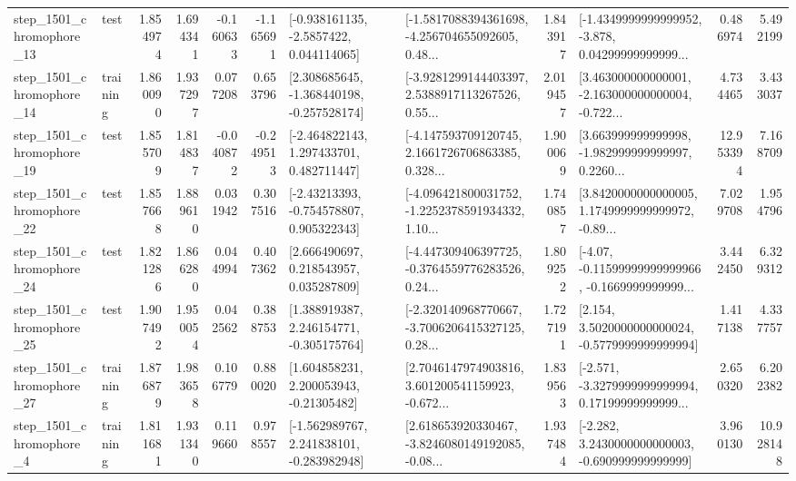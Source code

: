 \begin{tabular}{llrrrrllrlrr}
 step\_1501\_chromophore\_13 &      test &      1.854974 &    1.694341 &     -0.160633 & -1.165691 &     [-0.938161135, -2.5857422, 0.044114065] &  [-1.5817088394361698, -4.256704655092605, 0.48... &       1.843917 &  [-1.4349999999999952, -3.878, 0.04299999999999... &            0.486974 &          5.492199 \\
 step\_1501\_chromophore\_14 &  training &      1.860090 &    1.937297 &      0.077208 &  0.653796 &   [2.308685645, -1.368440198, -0.257528174] &  [-3.9281299144403397, 2.5388917113267526, 0.55... &       2.019457 &  [3.463000000000001, -2.163000000000004, -0.722... &            4.734465 &          3.433037 \\
 step\_1501\_chromophore\_19 &      test &      1.855709 &    1.814837 &     -0.040872 & -0.249513 &    [-2.464822143, 1.297433701, 0.482711447] &  [-4.147593709120745, 2.1661726706863385, 0.328... &       1.900069 &  [3.663999999999998, -1.982999999999997, 0.2260... &           12.953394 &          7.168709 \\
 step\_1501\_chromophore\_22 &      test &      1.857668 &    1.889610 &      0.031942 &  0.307516 &    [-2.43213393, -0.754578807, 0.905322343] &  [-4.096421800031752, -1.2252378591934332, 1.10... &       1.740857 &  [3.8420000000000005, 1.1749999999999972, -0.89... &            7.029708 &          1.954796 \\
 step\_1501\_chromophore\_24 &      test &      1.821286 &    1.866280 &      0.044994 &  0.407362 &     [2.666490697, 0.218543957, 0.035287809] &  [-4.447309406397725, -0.3764559776283526, 0.24... &       1.809252 &  [-4.07, -0.11599999999999966, -0.1669999999999... &            3.442450 &          6.329312 \\
 step\_1501\_chromophore\_25 &      test &      1.907492 &    1.950054 &      0.042562 &  0.388753 &    [1.388919387, 2.246154771, -0.305175764] &  [-2.320140968770667, -3.7006206415327125, 0.28... &       1.727191 &   [2.154, 3.5020000000000024, -0.5779999999999994] &            1.417138 &          4.337757 \\
 step\_1501\_chromophore\_27 &  training &      1.876879 &    1.983658 &      0.106779 &  0.880020 &     [1.604858231, 2.200053943, -0.21305482] &  [2.7046147974903816, 3.601200541159923, -0.672... &       1.839563 &  [-2.571, -3.3279999999999994, 0.17199999999999... &            2.650320 &          6.202382 \\
  step\_1501\_chromophore\_4 &  training &      1.811681 &    1.931340 &      0.119660 &  0.978557 &   [-1.562989767, 2.241838101, -0.283982948] &  [2.618653920330467, -3.8246080149192085, -0.08... &       1.937484 &   [-2.282, 3.2430000000000003, -0.690999999999999] &            3.960130 &         10.928148 \\

\end{tabular}
